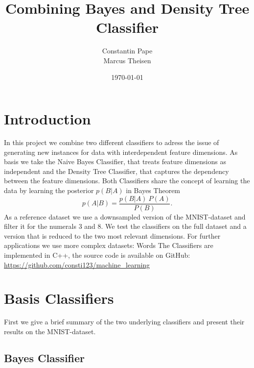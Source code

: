 \documentclass{article}
\title{Combining Bayes and Density Tree Classifier}
\author{Constantin Pape\\
        Marcus Theisen}
\date{\today}
\begin{document}
\maketitle

\section{Introduction}

In this project we combine two different classifiers to adress the issue of generating new instances for data with interdependent feature dimensions. As basis we take the Naive Bayes Classifier, that treats feature dimensions as independent and the Density Tree Classifier, that captures the dependency between the feature dimensions. 
\newline
Both Classifiers share the concept of learning the data by learning the posterior $p(B|A)$ in Bayes Theorem 
\begin{equation} \label{eq1}
	p(A|B) = \frac{p(B|A) ~ P(A)}{P(B)} .
\end{equation}
As a reference dataset we use a downsampled version of the MNIST-dataset and filter it for the numerals 3 and 8. We test the classifiers on the full dataset and a version that is reduced to the two most relevant dimensions.
For further applications we use more complex datasets: Words %
\newline
The Classifiers are implemented in C++, the source code is available on GitHub: \newline
\url{https://github.com/consti123/machine_learning}

\section{Basis Classifiers}

First we give a brief summary of the two underlying classifiers and present their results on the MNIST-dataset.

\subsection{Bayes Classifier}
\end{document}
